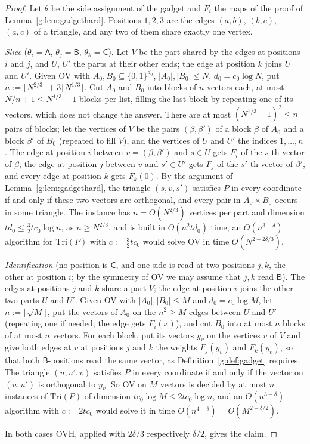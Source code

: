 \documentclass[11pt]{article}
\theoremstyle{definition}
\theoremstyle{remark}
\begin{document}
\begin{proof}
Let $\theta$ be the side assignment of the gadget and $F_i$ the maps of the proof of Lemma~\ref{g:lem:gadgethard}. Positions $1,2,3$ are the edges $(a,b)$, $(b,c)$, $(a,c)$ of a triangle, and any two of them share exactly one vertex.

\emph{Slice} ($\theta_i=\mathsf A$, $\theta_j=\mathsf B$, $\theta_k=\mathsf C$). Let $V$ be the part shared by the edges at positions $i$ and $j$, and $U$, $U'$ the parts at their other ends; the edge at position $k$ joins $U$ and $U'$. Given OV with $A_0,B_0\subseteq\{0,1\}^{d_0}$, $|A_0|,|B_0|\le N$, $d_0=c_0\log N$, put $n:=\lceil N^{2/3}\rceil+3\lceil N^{1/3}\rceil$. Cut $A_0$ and $B_0$ into blocks of $n$ vectors each, at most $N/n+1\le N^{1/3}+1$ blocks per list, filling the last block by repeating one of its vectors, which does not change the answer. There are at most $(N^{1/3}+1)^2\le n$ pairs of blocks; let the vertices of $V$ be the pairs $(\beta,\beta')$ of a block $\beta$ of $A_0$ and a block $\beta'$ of $B_0$ (repeated to fill $V$), and the vertices of $U$ and $U'$ the indices $1,\dots,n$. The edge at position $i$ between $v=(\beta,\beta')$ and $s\in U$ gets $F_i$ of the $s$-th vector of $\beta$, the edge at position $j$ between $v$ and $s'\in U'$ gets $F_j$ of the $s'$-th vector of $\beta'$, and every edge at position $k$ gets $F_k(0)$. By the argument of Lemma~\ref{g:lem:gadgethard}, the triangle $(s,v,s')$ satisfies $P$ in every coordinate if and only if these two vectors are orthogonal, and every pair in $A_0\times B_0$ occurs in some triangle. The instance has $n=O(N^{2/3})$ vertices per part and dimension $td_0\le\frac32tc_0\log n$, as $n\ge N^{2/3}$, and is built in $O(n^2td_0)$ time; an $O(n^{3-\delta})$ algorithm for $\mathrm{Tri}(P)$ with $c:=\frac32tc_0$ would solve OV in time $O(N^{2-2\delta/3})$.

\emph{Identification} (no position is $\mathsf C$, and one side is read at two positions $j,k$, the other at position $i$; by the symmetry of OV we may assume that $j,k$ read $\mathsf B$). The edges at positions $j$ and $k$ share a part $V$; the edge at position $i$ joins the other two parts $U$ and $U'$. Given OV with $|A_0|,|B_0|\le M$ and $d_0=c_0\log M$, let $n:=\lceil\sqrt M\rceil$, put the vectors of $A_0$ on the $n^2\ge M$ edges between $U$ and $U'$ (repeating one if needed; the edge gets $F_i(x)$), and cut $B_0$ into at most $n$ blocks of at most $n$ vectors. For each block, put its vectors $y_v$ on the vertices $v$ of $V$ and give both edges at $v$ at positions $j$ and $k$ the weights $F_j(y_v)$ and $F_k(y_v)$, so that both $\mathsf B$-positions read the same vector, as Definition~\ref{g:def:gadget} requires. The triangle $(u,u',v)$ satisfies $P$ in every coordinate if and only if the vector on $(u,u')$ is orthogonal to $y_v$. So OV on $M$ vectors is decided by at most $n$ instances of $\mathrm{Tri}(P)$ of dimension $tc_0\log M\le2tc_0\log n$, and an $O(n^{3-\delta})$ algorithm with $c:=2tc_0$ would solve it in time $O(n^{4-\delta})=O(M^{2-\delta/2})$.

In both cases OVH, applied with $2\delta/3$ respectively $\delta/2$, gives the claim.
\end{proof}
\end{document}

